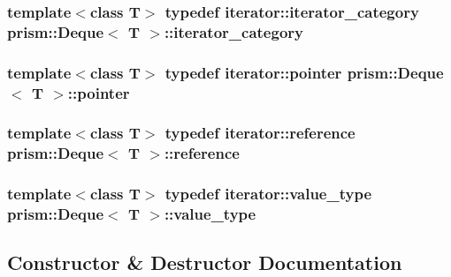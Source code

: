 \subsubsection[{\texorpdfstring{iterator\+\_\+category}{iterator_category}}]{\setlength{\rightskip}{0pt plus 5cm}template$<$class T$>$ typedef iterator\+::iterator\+\_\+category {\bf prism\+::\+Deque}$<$ T $>$\+::{\bf iterator\+\_\+category}}\hypertarget{classprism_1_1_deque_a5a8e5c9e68bc92b45fcf5b1dcae7418b}{}\label{classprism_1_1_deque_a5a8e5c9e68bc92b45fcf5b1dcae7418b}
\subsubsection[{\texorpdfstring{pointer}{pointer}}]{\setlength{\rightskip}{0pt plus 5cm}template$<$class T$>$ typedef iterator\+::pointer {\bf prism\+::\+Deque}$<$ T $>$\+::{\bf pointer}}\hypertarget{classprism_1_1_deque_a9cff677f1cdffd6f9900a84fd0fa7b17}{}\label{classprism_1_1_deque_a9cff677f1cdffd6f9900a84fd0fa7b17}
\subsubsection[{\texorpdfstring{reference}{reference}}]{\setlength{\rightskip}{0pt plus 5cm}template$<$class T$>$ typedef iterator\+::reference {\bf prism\+::\+Deque}$<$ T $>$\+::{\bf reference}}\hypertarget{classprism_1_1_deque_a93d8792e719ca205ce1b9ed5d8207c1d}{}\label{classprism_1_1_deque_a93d8792e719ca205ce1b9ed5d8207c1d}
\subsubsection[{\texorpdfstring{value\+\_\+type}{value_type}}]{\setlength{\rightskip}{0pt plus 5cm}template$<$class T$>$ typedef iterator\+::value\+\_\+type {\bf prism\+::\+Deque}$<$ T $>$\+::{\bf value\+\_\+type}}\hypertarget{classprism_1_1_deque_ab14234d70c36a687014d59a5569863c7}{}\label{classprism_1_1_deque_ab14234d70c36a687014d59a5569863c7}


\subsection{Constructor \& Destructor Documentation}
